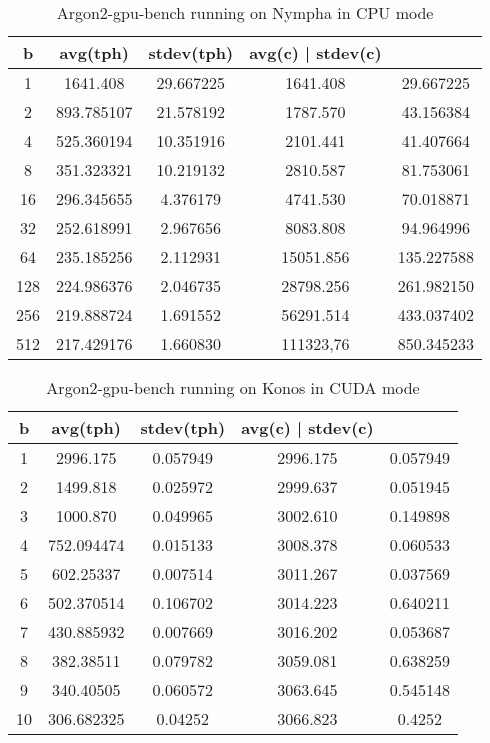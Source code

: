 \documentclass[nolof]{fithesis3}
\begin{document}
\noindent
\begin{table}
\caption{Argon2-gpu-bench running on Nympha in CPU mode}
\label{tab:nymphacpu}
\begin{tabularx}{\textwidth}{| c | c | c | c | c |}
\hline
b & avg(tph) & stdev(tph) & avg(c) | stdev(c)\\
\hline
1 & 1641.408 & 29.667225 & 1641.408 & 29.667225 \\
\hline
2 & 893.785107 & 21.578192 & 1787.570 & 43.156384 \\
\hline
4 & 525.360194 & 10.351916 & 2101.441 & 41.407664\\
\hline
8 & 351.323321 & 10.219132 & 2810.587 & 81.753061\\
\hline
16 & 296.345655 & 4.376179 & 4741.530 & 70.018871\\
\hline
32 & 252.618991 & 2.967656 & 8083.808 & 94.964996\\
\hline
64 & 235.185256 & 2.112931 & 15051.856 & 135.227588\\
\hline
128 & 224.986376 & 2.046735 & 28798.256 & 261.982150\\
\hline
256 & 219.888724 & 1.691552 & 56291.514 & 433.037402\\
\hline
512 & 217.429176 & 1.660830 & 111323,76 & 850.345233\\
\hline
\end{tabularx}
\end{table}

\noindent
\begin{table}
\caption{Argon2-gpu-bench running on Konos in CUDA mode}
\label{tab:konosgpu}
\begin{tabularx}{\textwidth}{| c | c | c | c | c |}
\hline
b & avg(tph) & stdev(tph) & avg(c) | stdev(c)\\
\hline
1 & 2996.175 & 0.057949 & 2996.175 & 0.057949\\
\hline
2 & 1499.818 & 0.025972 & 2999.637 & 0.051945 \\
\hline
3 & 1000.870 & 0.049965 & 3002.610 & 0.149898 \\
\hline
4 & 752.094474 & 0.015133 & 3008.378 & 0.060533 \\
\hline
5 & 602.25337 & 0.007514 & 3011.267 & 0.037569 \\
\hline
6 & 502.370514 & 0.106702 & 3014.223 & 0.640211 \\
\hline
7 & 430.885932 & 0.007669 & 3016.202 & 0.053687 \\
\hline
8 & 382.38511 & 0.079782 & 3059.081 & 0.638259 \\
\hline
9 & 340.40505 & 0.060572 & 3063.645 & 0.545148 \\
\hline
10 & 306.682325 & 0.04252 & 3066.823 & 0.4252 \\
\hline
\end{tabularx}
\end{table}
\end{document}
